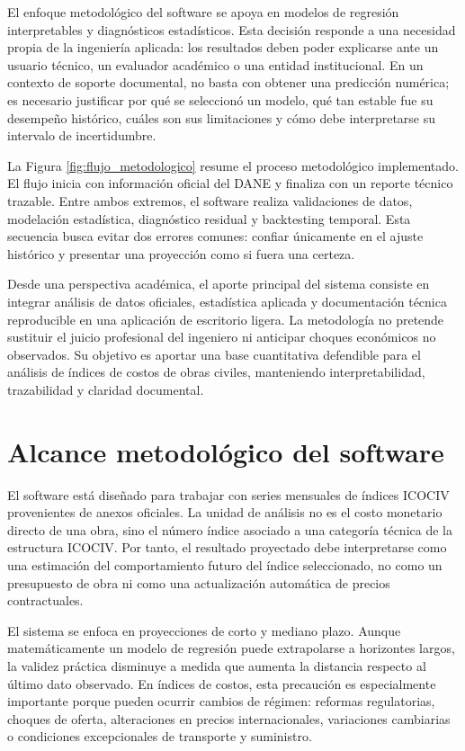 El enfoque metodológico del software se apoya en modelos de regresión interpretables y diagnósticos estadísticos. Esta decisión responde a una necesidad propia de la ingeniería aplicada: los resultados deben poder explicarse ante un usuario técnico, un evaluador académico o una entidad institucional. En un contexto de soporte documental, no basta con obtener una predicción numérica; es necesario justificar por qué se seleccionó un modelo, qué tan estable fue su desempeño histórico, cuáles son sus limitaciones y cómo debe interpretarse su intervalo de incertidumbre.

La Figura \ref{fig:flujo_metodologico} resume el proceso metodológico implementado. El flujo inicia con información oficial del DANE y finaliza con un reporte técnico trazable. Entre ambos extremos, el software realiza validaciones de datos, modelación estadística, diagnóstico residual y backtesting temporal. Esta secuencia busca evitar dos errores comunes: confiar únicamente en el ajuste histórico y presentar una proyección como si fuera una certeza.



Desde una perspectiva académica, el aporte principal del sistema consiste en integrar análisis de datos oficiales, estadística aplicada y documentación técnica reproducible en una aplicación de escritorio ligera. La metodología no pretende sustituir el juicio profesional del ingeniero ni anticipar choques económicos no observados. Su objetivo es aportar una base cuantitativa defendible para el análisis de índices de costos de obras civiles, manteniendo interpretabilidad, trazabilidad y claridad documental.

\section{Alcance metodológico del software}

El software está diseñado para trabajar con series mensuales de índices ICOCIV provenientes de anexos oficiales. La unidad de análisis no es el costo monetario directo de una obra, sino el número índice asociado a una categoría técnica de la estructura ICOCIV. Por tanto, el resultado proyectado debe interpretarse como una estimación del comportamiento futuro del índice seleccionado, no como un presupuesto de obra ni como una actualización automática de precios contractuales.

El sistema se enfoca en proyecciones de corto y mediano plazo. Aunque matemáticamente un modelo de regresión puede extrapolarse a horizontes largos, la validez práctica disminuye a medida que aumenta la distancia respecto al último dato observado. En índices de costos, esta precaución es especialmente importante porque pueden ocurrir cambios de régimen: reformas regulatorias, choques de oferta, alteraciones en precios internacionales, variaciones cambiarias o condiciones excepcionales de transporte y suministro.

